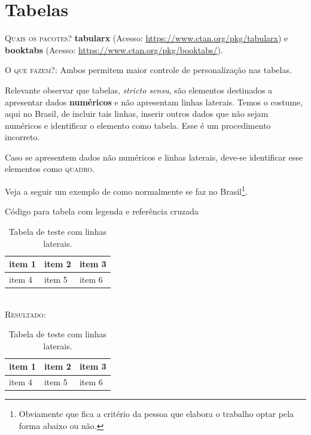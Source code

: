 \chapter{Tabelas}

\textsc{Quais os pacotes?} \textbf{tabularx} (Acesso: \url{https://www.ctan.org/pkg/tabularx}) e \textbf{booktabs} (Acesso: \url{https://www.ctan.org/pkg/booktabs/}).

\textsc{O que fazem?}: Ambos permitem maior controle de personalização nas tabelas. 

Relevante observar que tabelas, \textit{stricto sensu}, são elementos destinados a apresentar dados \textbf{numéricos} e não apresentam linhas laterais. Temos o costume, aqui no Brasil, de incluir tais linhas, inserir outros dados que não sejam numéricos e identificar o elemento como tabela. Esse é um procedimento incorreto. 

Caso se apresentem dados não numéricos e linhas laterais, deve-se identificar esse elementos como \textsc{quadro}.

Veja a seguir um exemplo de como normalmente se faz no Brasil\footnote{Obviamente que fica a critério da pessoa que elabora o trabalho optar pela forma abaixo ou não.}.
\ \\

\begin{codex}{Código para tabela com legenda e referência cruzada}
\begin{table}[h!]
	\begin{center}
	\begin{tabularx}{0.8\textwidth} { 
	| >{\centering\arraybackslash}X 
	| >{\centering\arraybackslash}X 
	| >{\centering\arraybackslash}X | }
	\hline
	item 1 & item 2 & item 3 \\
	\hline
	item 4  & item 5  & item 6  \\
	\hline
	\end{tabularx}
	\caption{Tabela de teste com linhas laterais.}
	\label{table:1}
	\end{center}
	\end{table}
\end{codex}
\ \\

\textsc{Resultado:}

\begin{table}[h!]
	\begin{center}
		\begin{tabularx}{0.8\textwidth} { 
				| >{\centering\arraybackslash}X 
				| >{\centering\arraybackslash}X 
				| >{\centering\arraybackslash}X | }
			\hline
			item 1 & item 2 & item 3 \\
			\hline
			item 4  & item 5  & item 6  \\
			\hline
		\end{tabularx}
		\caption{Tabela de teste com linhas laterais.}
		\label{table:1}
	\end{center}
\end{table}


